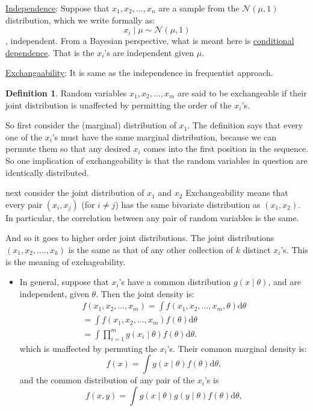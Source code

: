 \documentclass[lecture,12pt,]{pcms-l}
\numberwithin{section}{chapter}
\numberwithin{equation}{chapter}
\theoremstyle{plain}
\theoremstyle{definition}
\theoremstyle{definition}
\newtheorem{definition}[equation]{Definition}
\begin{document}
\underline{Independence}: Suppose that $x_1,x_2,...,x_n$ are a sample from the $\mathcal{N}(\mu ,1)$ distribution, which we write formally as:
\begin{equation}
x_i \mid \mu \sim \mathcal{N}(\mu ,1)
\end{equation}
, independent.  From a  Bayesian perspective, what is meant here is \underline{conditional dependence}. That is the $x_i$'s are independent given $\mu$.

\underline{Exchangaability}: It is same as the independence in frequentist approach.
\begin{definition}
Random variables $x_1,x_2,...,x_m$ are said to be exchangeable if their joint distribution is unaffected by permitting the order of the $x_i$'s.
\end{definition}
So first consider the (marginal) distribution of $x_1$. The definition says that every one of the $x_i$'s must have the same marginal distribution, because we can permute them so that any desired $x_i$ comes into the first position in the sequence. So one implication of exchangeability is that the  random variables in question are identically distributed.

next consider the joint distribution of $x_1$ and $x_2$ Exchangeability means that every pair $(x_i,x_j)$ (for $i \neq j$) has the same bivariate distribution as $(x_1,x_2)$. In particular, the correlation between any pair of random variables is the same.

And so it goes to higher order joint distributions. The joint distributions $(x_1,x_2,....,x_k)$ is the same as that of any other collection of $k$ distinct $x_i$'s. This is the meaning of exchageability.

\begin{itemize}
\item In general, suppose that $x_i$'s have a common distribution $g(x \mid \theta)$, and are independent, given $\theta$. Then the joint density is:
\begin{equation}
\begin{split}
f(x_1,x_2,...,x_m)=\int f(x_1,x_2,...,x_m, \theta) \mathrm{d}\theta
\\
=\int f(x_1,x_2,...,x_m)f(\theta)\mathrm{d}\theta
\\
= \int \prod_{i=1}^{m}g(x_i \mid \theta)f(\theta)\mathrm{d} \theta.
\end{split}
\end{equation}
which is unaffected by permuting the $x_i$'s. Their  common marginal density is:
\begin{equation}
f(x)=\int g(x \mid \theta) f(\theta) \mathrm{d} \theta,
\end{equation} 
and the common distribution of any pair of the $x_i$'s is 
\begin{equation}
f(x,y)=\int g(x \mid \theta)g(y \mid \theta) f(\theta) \mathrm{d} \theta,
\end{equation} 
\end{itemize}
\end{document}

